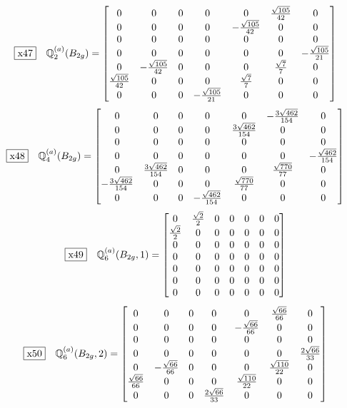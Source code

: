 \documentclass[fleqn,10pt,landscape]{jsarticle}
\begin{document}
\begin{dmath*}
\fbox{x47}\quad \mathbb{Q}_{2}^{(a)}(B_{2g})=\begin{bmatrix} 0 & 0 & 0 & 0 & 0 & \frac{\sqrt{105}}{42} & 0 \\ 0 & 0 & 0 & 0 & - \frac{\sqrt{105}}{42} & 0 & 0 \\ 0 & 0 & 0 & 0 & 0 & 0 & 0 \\ 0 & 0 & 0 & 0 & 0 & 0 & - \frac{\sqrt{105}}{21} \\ 0 & - \frac{\sqrt{105}}{42} & 0 & 0 & 0 & \frac{\sqrt{7}}{7} & 0 \\ \frac{\sqrt{105}}{42} & 0 & 0 & 0 & \frac{\sqrt{7}}{7} & 0 & 0 \\ 0 & 0 & 0 & - \frac{\sqrt{105}}{21} & 0 & 0 & 0 \end{bmatrix}
\end{dmath*}
\begin{dmath*}
\fbox{x48}\quad \mathbb{Q}_{4}^{(a)}(B_{2g})=\begin{bmatrix} 0 & 0 & 0 & 0 & 0 & - \frac{3 \sqrt{462}}{154} & 0 \\ 0 & 0 & 0 & 0 & \frac{3 \sqrt{462}}{154} & 0 & 0 \\ 0 & 0 & 0 & 0 & 0 & 0 & 0 \\ 0 & 0 & 0 & 0 & 0 & 0 & - \frac{\sqrt{462}}{154} \\ 0 & \frac{3 \sqrt{462}}{154} & 0 & 0 & 0 & \frac{\sqrt{770}}{77} & 0 \\ - \frac{3 \sqrt{462}}{154} & 0 & 0 & 0 & \frac{\sqrt{770}}{77} & 0 & 0 \\ 0 & 0 & 0 & - \frac{\sqrt{462}}{154} & 0 & 0 & 0 \end{bmatrix}
\end{dmath*}
\begin{dmath*}
\fbox{x49}\quad \mathbb{Q}_{6}^{(a)}(B_{2g},1)=\begin{bmatrix} 0 & \frac{\sqrt{2}}{2} & 0 & 0 & 0 & 0 & 0 \\ \frac{\sqrt{2}}{2} & 0 & 0 & 0 & 0 & 0 & 0 \\ 0 & 0 & 0 & 0 & 0 & 0 & 0 \\ 0 & 0 & 0 & 0 & 0 & 0 & 0 \\ 0 & 0 & 0 & 0 & 0 & 0 & 0 \\ 0 & 0 & 0 & 0 & 0 & 0 & 0 \\ 0 & 0 & 0 & 0 & 0 & 0 & 0 \end{bmatrix}
\end{dmath*}
\begin{dmath*}
\fbox{x50}\quad \mathbb{Q}_{6}^{(a)}(B_{2g},2)=\begin{bmatrix} 0 & 0 & 0 & 0 & 0 & \frac{\sqrt{66}}{66} & 0 \\ 0 & 0 & 0 & 0 & - \frac{\sqrt{66}}{66} & 0 & 0 \\ 0 & 0 & 0 & 0 & 0 & 0 & 0 \\ 0 & 0 & 0 & 0 & 0 & 0 & \frac{2 \sqrt{66}}{33} \\ 0 & - \frac{\sqrt{66}}{66} & 0 & 0 & 0 & \frac{\sqrt{110}}{22} & 0 \\ \frac{\sqrt{66}}{66} & 0 & 0 & 0 & \frac{\sqrt{110}}{22} & 0 & 0 \\ 0 & 0 & 0 & \frac{2 \sqrt{66}}{33} & 0 & 0 & 0 \end{bmatrix}
\end{dmath*}
\end{document}
